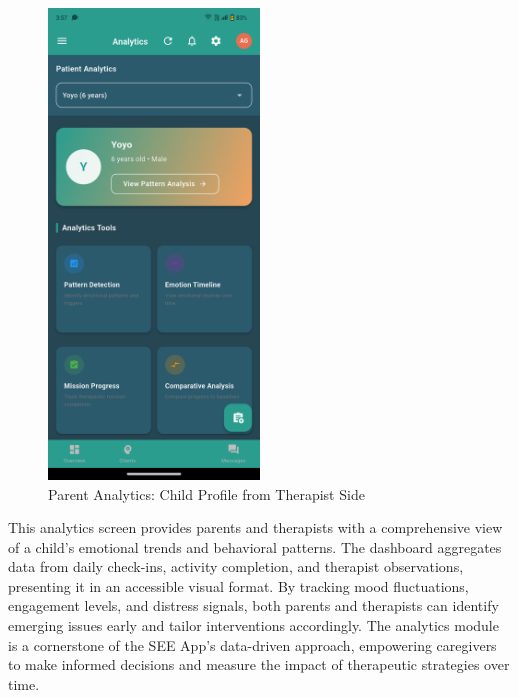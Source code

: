 \documentclass[12pt,a4paper]{article}
\begin{document}
\begin{figure}[H]
    \centering
    \includegraphics[width=0.5\textwidth]{Screenshots/parentanalytics(childprofilefromtherapistside).png}
    \caption{Parent Analytics: Child Profile from Therapist Side}
    \label{fig:parent-analytics-therapist}
\end{figure}
This analytics screen provides parents and therapists with a comprehensive view of a child's emotional trends and behavioral patterns. The dashboard aggregates data from daily check-ins, activity completion, and therapist observations, presenting it in an accessible visual format. By tracking mood fluctuations, engagement levels, and distress signals, both parents and therapists can identify emerging issues early and tailor interventions accordingly. The analytics module is a cornerstone of the SEE App's data-driven approach, empowering caregivers to make informed decisions and measure the impact of therapeutic strategies over time.
\end{document}
